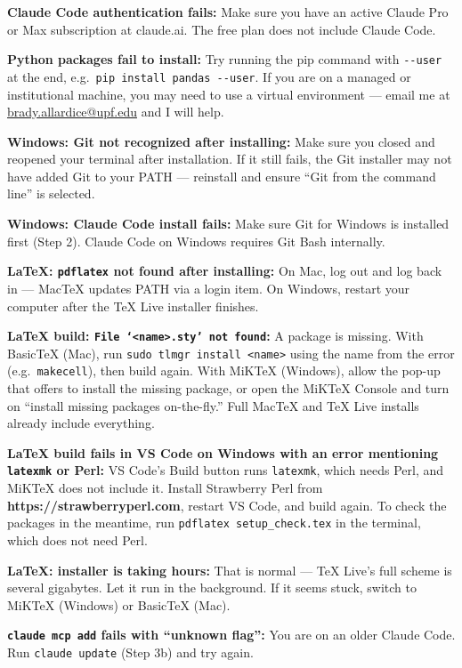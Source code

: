\documentclass[11pt]{article}
\begin{document}
\textbf{Claude Code authentication fails:} Make sure you have an active Claude Pro or Max subscription at claude.ai. The free plan does not include Claude Code.

\textbf{Python packages fail to install:} Try running the pip command with \texttt{-\/-user} at the end, e.g.\ \texttt{pip install pandas -\/-user}. If you are on a managed or institutional machine, you may need to use a virtual environment --- email me at \href{mailto:brady.allardice@upf.edu}{brady.allardice@upf.edu} and I will help.

\textbf{Windows: Git not recognized after installing:} Make sure you closed and reopened your terminal after installation. If it still fails, the Git installer may not have added Git to your PATH --- reinstall and ensure ``Git from the command line'' is selected.

\textbf{Windows: Claude Code install fails:} Make sure Git for Windows is installed first (Step 2). Claude Code on Windows requires Git Bash internally.

\textbf{LaTeX: \texttt{pdflatex} not found after installing:} On Mac, log out and log back in --- MacTeX updates PATH via a login item. On Windows, restart your computer after the TeX Live installer finishes.

\textbf{LaTeX build: \texttt{File `<name>.sty' not found}:} A package is missing. With BasicTeX (Mac), run \texttt{sudo tlmgr install <name>} using the name from the error (e.g.\ \texttt{makecell}), then build again. With MiKTeX (Windows), allow the pop-up that offers to install the missing package, or open the MiKTeX Console and turn on ``install missing packages on-the-fly.'' Full MacTeX and TeX Live installs already include everything.

\textbf{LaTeX build fails in VS Code on Windows with an error mentioning \texttt{latexmk} or Perl:} VS Code's Build button runs \texttt{latexmk}, which needs Perl, and MiKTeX does not include it. Install Strawberry Perl from \textbf{https://strawberryperl.com}, restart VS Code, and build again. To check the packages in the meantime, run \texttt{pdflatex setup\_check.tex} in the terminal, which does not need Perl.

\textbf{LaTeX: installer is taking hours:} That is normal --- TeX Live's full scheme is several gigabytes. Let it run in the background. If it seems stuck, switch to MiKTeX (Windows) or BasicTeX (Mac).

\textbf{\texttt{claude mcp add} fails with ``unknown flag'':} You are on an older Claude Code. Run \texttt{claude update} (Step 3b) and try again.
\end{document}
